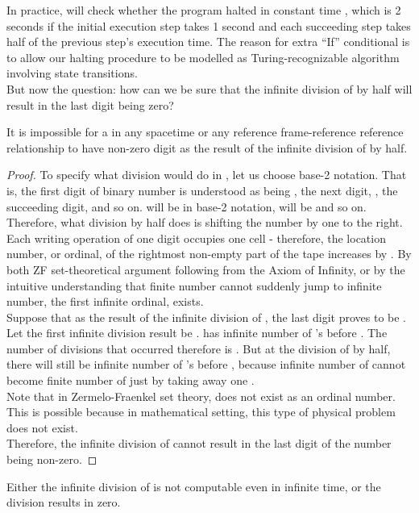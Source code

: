 \documentclass{roffin}
\begin{document}
In practice,  will check whether the program  halted in constant time , which is 2 seconds if the initial execution step takes 1 second and each succeeding step takes half of the previous step's execution time. The reason for extra ``If'' conditional is to allow our halting procedure to be modelled as Turing-recognizable algorithm involving state transitions.\\
But now the question: how can we be sure that the infinite division of  by half will result in the last digit being zero?\\
\begin{proposition}
It is impossible for a  in any spacetime or any reference frame-reference reference relationship to have non-zero digit as the result of the infinite division of  by half.
\end{proposition}
\begin{proof}
To specify what division would do in , let us choose base-2 notation. That is, the first digit of binary number is understood as being , the next digit, , the succeeding digit,  and so on.  will be  in base-2 notation,  will be  and so on. Therefore, what division by half does is shifting the number by one to the right.\\
Each writing operation of one digit occupies one cell - therefore, the location number, or ordinal, of the rightmost non-empty part of the tape increases by . By both ZF set-theoretical argument following from the Axiom of Infinity, or by the intuitive understanding that finite number cannot suddenly jump to infinite number, the first infinite ordinal,  exists.\\
Suppose that as the result of the infinite division of , the last digit proves to be . Let the first infinite division result be .  has infinite number of 's before . The number of divisions that occurred therefore is . But at the  division of  by half, there will still be infinite number of 's before , because infinite number of  cannot become finite number of  just by taking away one .\\
Note that in Zermelo-Fraenkel set theory,  does not exist as an ordinal number. This is possible because in mathematical setting, this type of physical problem does not exist.\\
Therefore, the infinite division of  cannot result in the last digit of the number being non-zero.
\end{proof}
\begin{proposition}
Either the infinite division of  is not computable even in infinite time, or the division results in zero.
\end{proposition}
\end{document}
